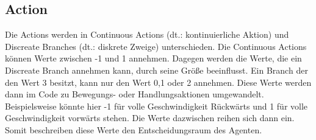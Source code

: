 \subsection{Action}
\label{action}
Die Actions werden in Continuous Actions (dt.: kontinuierliche Aktion) und Discreate Branches (dt.: diskrete Zweige) unterschieden. Die Continuous Actions können Werte zwischen -1 und 1 annehmen. Dagegen werden die Werte, die ein Discreate Branch annehmen kann, durch seine Größe beeinflusst. Ein Branch der den Wert 3 besitzt, kann nur den Wert 0,1 oder 2 annehmen. Diese Werte werden dann im Code zu Bewegungs- oder Handlungsaktionen umgewandelt. Beispielsweise könnte hier -1 für volle Geschwindigkeit Rückwärts und 1 für volle Geschwindigkeit vorwärts stehen. Die Werte dazwischen reihen sich dann ein. Somit beschreiben diese Werte den Entscheidungsraum des Agenten. 

